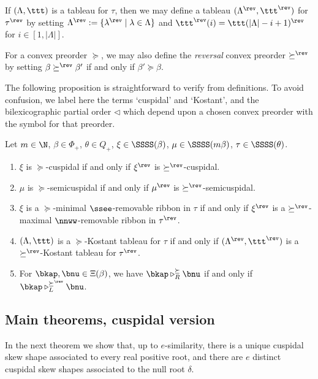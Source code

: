 If \((\Lambda, \ttt)\) is a tableau for \(\tau\), then we may define a tableau \((\Lambda^\rev, \ttt^\rev)\) for \(\tau^\rev\) by setting \(\Lambda^\rev :=\{ \lambda^\rev \mid \lambda \in \Lambda\}\) and \(\ttt^\rev(i) = \ttt(|\Lambda| - i +1)^\rev\) for \(i \in [1,|\Lambda|]\).

For a convex preorder \(\succeq\), we may also define the {\em reversal} convex preorder \(\succeq^\rev\) by setting \(\beta \succeq^\rev \beta'\) if and only if \(\beta' \succeq \beta\). 

The following proposition is straightforward to verify from definitions. To avoid confusion, we label here the terms `cuspidal' and `Kostant', and the bilexicographic partial order \(\triangleleft\) which depend upon a chosen convex preorder with the symbol for that preorder.

\begin{prop}\label{revlem}
Let \(m \in \N\), \(\beta \in \Phi_+\), \(\theta \in Q_+\), \(\xi \in \SSSS(\beta)\), \(\mu \in \SSSS(m \beta)\), \(\tau \in \SSSS(\theta)\).
\begin{enumerate}
\item \(\xi\) is \(\succeq\)-cuspidal if and only if \(\xi^\rev\) is \(\succeq^\rev\)-cuspidal.
\item \(\mu\) is \(\succeq\)-semicuspidal if and only if \(\mu^\rev\) is \(\succeq^\rev\)-semicuspidal.
\item \(\xi\) is a \(\succeq\)-minimal \(\ssee\)-removable ribbon in \(\tau\) if and only if \(\xi^\rev\) is a \(\succeq^\rev\)-maximal \(\nnww\)-removable ribbon in \(\tau^\rev\).
\item \((\Lambda, \ttt)\) is a \(\succeq\)-Kostant tableau for \(\tau\) if and only if \((\Lambda^\rev, \ttt^\rev)\) is a \(\succeq^\rev\)-Kostant tableau for \(\tau^\rev\).
\item For \(\bkap, \bnu \in \Xi(\beta)\), we have \(\bkap \triangleright^{\succeq}_R \bnu\) if and only if \(\bkap \triangleright^{\succeq^\rev}_L \bnu\).
\end{enumerate}
\end{prop}

\subsection{Main theorems, cuspidal version}

In the next theorem we show that, up to \(e\)-similarity, there is a unique cuspidal skew shape associated to every real positive root, and there are \(e\) distinct cuspidal skew shapes associated to the null root \(\delta\).


